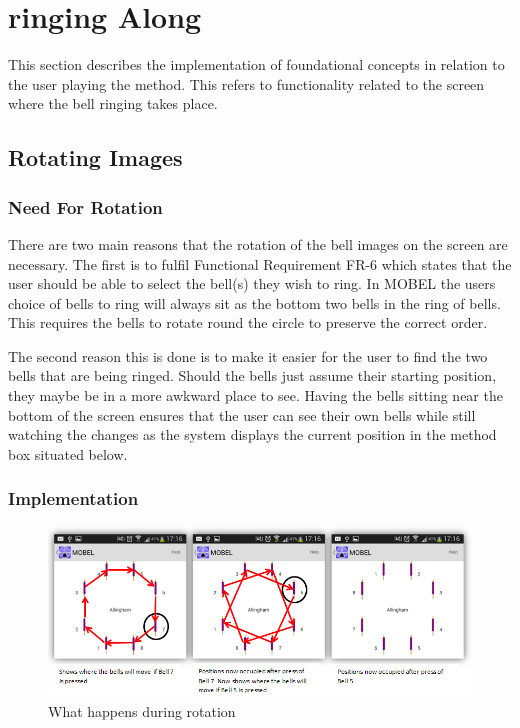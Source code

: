 \documentclass{l4proj}
\begin{document}
\section{ringing Along}
This section describes the implementation of foundational concepts in relation to the user playing the method.  This refers to functionality related to the screen where the bell ringing takes place.  

\subsection{Rotating Images}
\subsubsection{Need For Rotation}
There are two main reasons that the rotation of the bell images on the screen are necessary.  The first is to fulfil Functional Requirement FR-6 which states that the user should be able to select the bell(s) they wish to ring. In MOBEL the users choice of bells to ring will always sit as the bottom two bells in the ring of bells.  This requires the bells to rotate round the circle to preserve the correct order.

The second reason this is done is to make it easier for the user to find the two bells that are being ringed.  Should the bells just assume their starting position, they maybe be in a more awkward place to see.  Having the bells sitting near the bottom of the screen ensures that the user can see their own bells while still watching the changes as the system displays the current position in the method box situated below.



\subsubsection{Implementation}

\begin{figure}
\centering
\includegraphics[width=15cm]{Rotation.png}
\caption{What happens during rotation}
\label{Rotation}
\end{figure}
\end{document}
